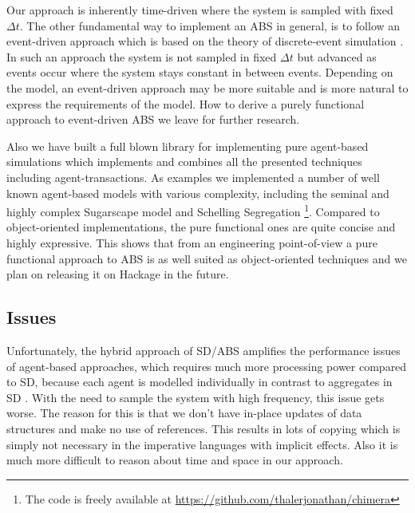 Our approach is inherently time-driven where the system is sampled with fixed $\Delta t$. The other fundamental way to implement an ABS in general, is to follow an event-driven approach \cite{meyer_event-driven_2014} which is based on the theory of discrete-event simulation \cite{zeigler_theory_2000}. In such an approach the system is not sampled in fixed $\Delta t$ but advanced as events occur where the system stays constant in between events. Depending on the model, an event-driven approach may be more suitable and is more natural to express the requirements of the model. How to derive a purely functional approach to event-driven ABS we leave for further research.

Also we have built a full blown library for implementing pure agent-based simulations which implements and combines all the presented techniques including agent-transactions. As examples we implemented a number of well known agent-based models with various complexity, including the seminal and highly complex Sugarscape model \cite{epstein_growing_1996} and Schelling Segregation \cite{schelling_dynamic_1971} \footnote{The code is freely available at \url{https://github.com/thalerjonathan/chimera}}. Compared to object-oriented implementations, the pure functional ones are quite concise and highly expressive. This shows that from an engineering point-of-view a pure functional approach to ABS is as well suited as object-oriented techniques and we plan on releasing it on Hackage in the future.

\subsection*{Issues}
Unfortunately, the hybrid approach of SD/ABS amplifies the performance issues of agent-based approaches, which requires much more processing power compared to SD, because each agent is modelled individually in contrast to aggregates in SD \cite{macal_agent-based_2010}. With the need to sample the system with high frequency, this issue gets worse. The reason for this is that we don't have in-place updates of data structures and make no use of references. This results in lots of copying which is simply not necessary in the imperative languages with implicit effects. Also it is much more difficult to reason about time and space in our approach. %

